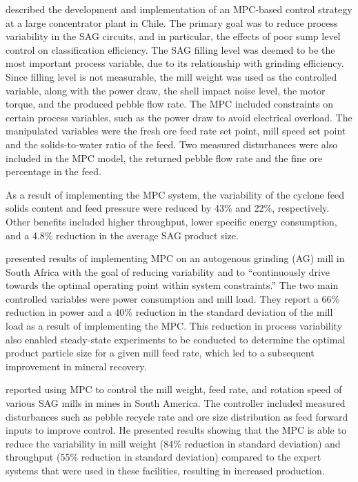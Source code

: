 \cite{yutronic_sag_2011} described the development and implementation of an \gls{MPC}-based control strategy at a large concentrator plant in Chile. The primary goal was to reduce process variability in the \gls{SAG} circuits, and in particular, the effects of poor sump level control on classification efficiency. The \gls{SAG} filling level was deemed to be the most important process variable, due to its relationship with grinding efficiency. Since filling level is not measurable, the mill weight was used as the controlled variable, along with the power draw, the shell impact noise level, the motor torque, and the produced pebble flow rate. The \gls{MPC} included constraints on certain process variables, such as the power draw to avoid electrical overload. The manipulated variables were the fresh ore feed rate set point, mill speed set point and the solids-to-water ratio of the feed. Two measured disturbances were also included in the \gls{MPC} model, the returned pebble flow rate and the fine ore percentage in the feed.

As a result of implementing the \gls{MPC} system, the variability of the cyclone feed solids content and feed pressure were reduced by 43\% and 22\%, respectively. Other benefits included higher throughput, lower specific energy consumption, and a 4.8\% reduction in the average \gls{SAG} product size.

\cite{steyn_benefits_2013} presented results of implementing \gls{MPC} on an autogenous grinding (\gls{AG}) mill in South Africa with the goal of reducing variability and to ``continuously drive towards the optimal operating point within system constraints.'' The two main controlled variables were power consumption and mill load. They report a 66\% reduction in power and a 40\% reduction in the standard deviation of the mill load as a result of implementing the \gls{MPC}. This reduction in process variability also enabled steady-state experiments to be conducted to determine the optimal product particle size for a given mill feed rate, which led to a subsequent improvement in mineral recovery.

\cite{gough_sag_2015} reported using \gls{MPC} to control the mill weight, feed rate, and rotation speed of various \gls{SAG} mills in mines in South America. The controller included measured disturbances such as pebble recycle rate and ore size distribution as feed forward inputs to improve control. He presented results showing that the \gls{MPC} is able to reduce the variability in mill weight (84\% reduction in standard deviation) and throughput (55\% reduction in standard deviation) compared to the expert systems that were used in these facilities, resulting in increased production.

